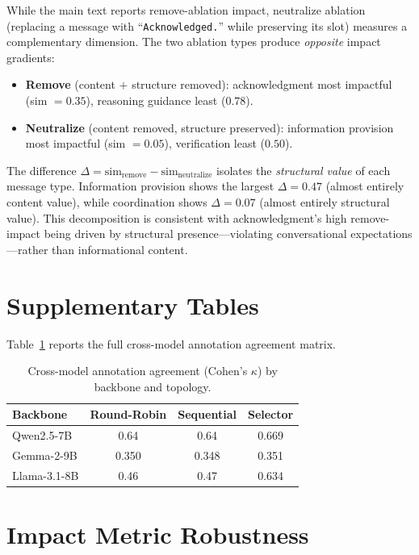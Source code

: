 While the main text reports remove-ablation impact, neutralize ablation (replacing a message with ``\texttt{Acknowledged.}'' while preserving its slot) measures a complementary dimension. The two ablation types produce \emph{opposite} impact gradients:

\begin{itemize}[nosep, leftmargin=*]
    \item \textbf{Remove} (content $+$ structure removed): acknowledgment most impactful (sim $= 0.35$), reasoning guidance least ($0.78$).
    \item \textbf{Neutralize} (content removed, structure preserved): information provision most impactful (sim $= 0.05$), verification least ($0.50$).
\end{itemize}

The difference $\Delta = \text{sim}_{\text{remove}} - \text{sim}_{\text{neutralize}}$ isolates the \emph{structural value} of each message type. Information provision shows the largest $\Delta = 0.47$ (almost entirely content value), while coordination shows $\Delta = 0.07$ (almost entirely structural value). This decomposition is consistent with acknowledgment's high remove-impact being driven by structural presence---violating conversational expectations---rather than informational content.

\section{Supplementary Tables}
\label{app:supplementary}

Table~\ref{tab:kappa_full} reports the full cross-model annotation agreement matrix.

\begin{table}[htbp]
\centering
\caption{Cross-model annotation agreement (Cohen's $\kappa$) by backbone and topology.}
\label{tab:kappa_full}
\small
\begin{tabular}{lccc}
\toprule
\textbf{Backbone} & \textbf{Round-Robin} & \textbf{Sequential} & \textbf{Selector} \\
\midrule
Qwen2.5-7B  & 0.64 & 0.64 & 0.669 \\
Gemma-2-9B  & 0.350 & 0.348 & 0.351 \\
Llama-3.1-8B & 0.46 & 0.47 & 0.634 \\
\bottomrule
\end{tabular}
\end{table}

\section{Impact Metric Robustness}
\label{app:metric-robustness}

